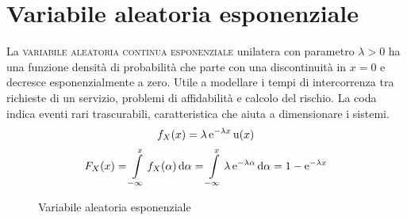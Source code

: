 \section{Variabile aleatoria esponenziale}
La \textsc{variabile aleatoria continua esponenziale} unilatera con parametro $\lambda>0$ ha una funzione densità di probabilità che parte con una discontinuità in $x=0$ e decresce esponenzialmente a zero. Utile a modellare i tempi di intercorrenza tra richieste di un servizio, problemi di affidabilità e calcolo del rischio. La coda indica eventi rari trascurabili, caratteristica che aiuta a dimensionare i sistemi.
\begin{equation}
f_X(x)=\lambda\operatorname{e}^{-\lambda x}\operatorname{u}(x)
\end{equation}
\begin{equation}
F_X(x)=\int\limits_{-\infty}^{x}{f_X(\alpha)}{\,\mathop{}\!\mathrm{d}{\alpha}}=\int\limits_{-\infty}^{x}{\lambda\operatorname{e}^{-\lambda \alpha}}{\,\mathop{}\!\mathrm{d}{\alpha}}=1-\operatorname{e}^{-\lambda x}
\end{equation}
\begin{figure}[!ht]
	\centering
	 \qquad
	\caption{Variabile aleatoria esponenziale}
\end{figure}

